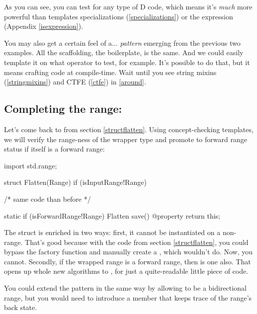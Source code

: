 As you can see, you can test for any type of D code, which means it's \emph{much} more powerful than templates specializations (\ref{specializations}) or the  expression (Appendix \ref{isexpression}).

You may also get a certain feel of a... \emph{pattern} emerging from the previous two examples. All the scaffolding, the boilerplate, is the same. And we could easily template it on what operator to test, for example. It's possible to do that, but it means crafting code at compile-time. Wait until you see string mixins (\ref{stringmixins}) and CTFE (\ref{ctfe}) in \autoref{around}.

\subsection{Completing the  range:} 

Let's come back to  from section \ref{structflatten}. Using concept-checking templates, we will verify the range-ness of the wrapper type and promote  to forward range status if  itself is a forward range:

\begin{dcode}
import std.range;

struct Flatten(Range) if (isInputRange!Range)
{
    /* same code than before */

    static if (isForwardRange!Range)
        Flatten save() @property
        {
           return this;
        }
}
\end{dcode}

The struct is enriched in two ways: first, it cannot be instantiated on a non-range. That's good because with the code from section \ref{structflatten}, you could bypass the factory function and manually create a , which wouldn't do. Now, you cannot. Secondly, if the wrapped range is a forward range, then  is one also. That opens up whole new algorithms to , for just a quite-readable little piece of code.

You could extend the pattern in the same way by allowing  to be a bidirectional range, but you would need to introduce a  member that keeps trace of the range's back state.


